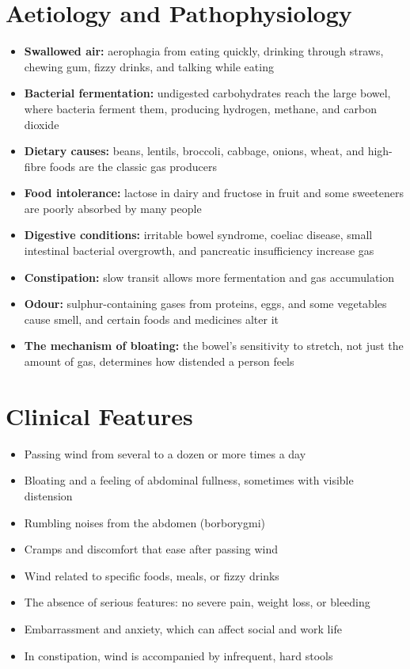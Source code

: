 \section*{Aetiology and Pathophysiology}
\begin{itemize}
    \item \textbf{Swallowed air:} aerophagia from eating quickly, drinking through straws, chewing gum, fizzy drinks, and talking while eating
    \item \textbf{Bacterial fermentation:} undigested carbohydrates reach the large bowel, where bacteria ferment them, producing hydrogen, methane, and carbon dioxide
    \item \textbf{Dietary causes:} beans, lentils, broccoli, cabbage, onions, wheat, and high-fibre foods are the classic gas producers
    \item \textbf{Food intolerance:} lactose in dairy and fructose in fruit and some sweeteners are poorly absorbed by many people
    \item \textbf{Digestive conditions:} irritable bowel syndrome, coeliac disease, small intestinal bacterial overgrowth, and pancreatic insufficiency increase gas
    \item \textbf{Constipation:} slow transit allows more fermentation and gas accumulation
    \item \textbf{Odour:} sulphur-containing gases from proteins, eggs, and some vegetables cause smell, and certain foods and medicines alter it
    \item \textbf{The mechanism of bloating:} the bowel's sensitivity to stretch, not just the amount of gas, determines how distended a person feels
\end{itemize}

\section*{Clinical Features}
\begin{itemize}
    \item Passing wind from several to a dozen or more times a day
    \item Bloating and a feeling of abdominal fullness, sometimes with visible distension
    \item Rumbling noises from the abdomen (borborygmi)
    \item Cramps and discomfort that ease after passing wind
    \item Wind related to specific foods, meals, or fizzy drinks
    \item The absence of serious features: no severe pain, weight loss, or bleeding
    \item Embarrassment and anxiety, which can affect social and work life
    \item In constipation, wind is accompanied by infrequent, hard stools
\end{itemize}

